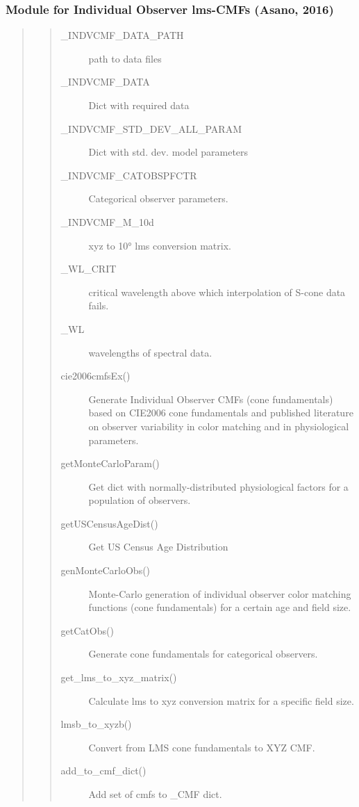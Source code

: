 \documentclass[letterpaper,10pt,english]{sphinxmanual}
\begin{document}
\subsubsection{Module for Individual Observer lms-CMFs (Asano, 2016)}
\label{\detokenize{toolboxes:module-for-individual-observer-lms-cmfs-asano-2016}}\begin{quote}
\begin{quote}\begin{description}
\item[{\_INDVCMF\_DATA\_PATH}] \leavevmode
path to data files

\item[{\_INDVCMF\_DATA}] \leavevmode
Dict with required data

\item[{\_INDVCMF\_STD\_DEV\_ALL\_PARAM}] \leavevmode
Dict with std. dev. model parameters

\item[{\_INDVCMF\_CATOBSPFCTR}] \leavevmode
Categorical observer parameters.

\item[{\_INDVCMF\_M\_10d}] \leavevmode
xyz to 10° lms conversion matrix.

\item[{\_WL\_CRIT}] \leavevmode
critical wavelength above which interpolation of S-cone data fails.

\item[{\_WL}] \leavevmode
wavelengths of spectral data.

\item[{cie2006cmfsEx()}] \leavevmode
Generate Individual Observer CMFs (cone fundamentals) 
based on CIE2006 cone fundamentals and published literature 
on observer variability in color matching and 
in physiological parameters.

\item[{getMonteCarloParam()}] \leavevmode
Get dict with normally-distributed physiological 
factors for a population of observers.

\item[{getUSCensusAgeDist()}] \leavevmode
Get US Census Age Distribution

\item[{genMonteCarloObs()}] \leavevmode
Monte-Carlo generation of individual observer 
color matching functions (cone fundamentals) for a
certain age and field size.

\item[{getCatObs()}] \leavevmode
Generate cone fundamentals for categorical observers.

\item[{get\_lms\_to\_xyz\_matrix()}] \leavevmode
Calculate lms to xyz conversion matrix for a 
specific field size.

\item[{lmsb\_to\_xyzb()}] \leavevmode
Convert from LMS cone fundamentals to XYZ CMF.

\item[{add\_to\_cmf\_dict()}] \leavevmode
Add set of cmfs to \_CMF dict.

\end{description}\end{quote}
\end{quote}
\end{document}
